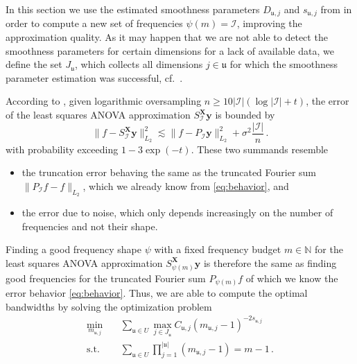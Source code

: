 \documentclass[a4paper]{scrartcl}
\numberwithin{equation}{section}
\begin{document}
In this section we use the estimated smoothness parameters $D_{\mathfrak u,j}$ and $s_{\mathfrak u,j}$ from  in order to compute a new set of frequencies $\psi(m) = \mathcal I$, improving the approximation quality.
As it may happen that we are not able to detect the smoothness parameters for certain dimensions for a lack of available data, we define the set $J_{\mathfrak u}$, which collects all dimensions $j\in\mathfrak u$ for which the smoothness parameter estimation was successful, cf.~.

According to \cite[Theorem~1.1]{Bartel22}, given logarithmic oversampling $n\ge 10|\mathcal I|(\log|\mathcal I| + t)$, the error of the least squares ANOVA approximation $S_{\mathcal I}^{\bm X}\bm y$ is bounded by
\begin{equation}\label{eq:sap}
    \|f-S_{\mathcal I}^{\bm X}\bm y\|_{L_2}^{2}
    \lesssim \|f-P_{\mathcal I}\bm y\|_{L_2}^{2} + \sigma^2\frac{|\mathcal I|}{n} \,.
\end{equation}
with probability exceeding $1-3\exp(-t)$.
These two summands resemble
\begin{itemize}
    \item the truncation error behaving the same as the truncated Fourier sum $\|P_{\mathcal I} f - f\|_{L_2}$, which we already know from \eqref{eq:behavior}, and
    \item the error due to noise, which only depends increasingly on the number of frequencies and not their shape.
\end{itemize}
Finding a good frequency shape $\psi$ with a fixed frequency budget $m\in\mathds N$ for the least squares ANOVA approximation $S_{\psi(m)}^{\bm X}\bm y$ is therefore the same as finding good frequencies for the truncated Fourier sum $P_{\psi(m)}f$ of which we know the error behavior \eqref{eq:behavior}.
Thus, we are able to compute the optimal bandwidths by solving the optimization problem
\begin{equation}\label{eq:opti}
    \begin{aligned}
        \min_{m_{\mathfrak u,j}} \quad &\sum_{\mathfrak u\in U} \max_{j\in J_{\mathfrak u}} C_{\mathfrak u,j} (m_{\mathfrak u,j}-1)^{-2s_{\mathfrak u,j}} \\
        \mathrm{s.t.} \quad &\sum_{\mathfrak u\in U} \prod_{j=1}^{|\mathfrak u|} (m_{\mathfrak u,j}-1) = m-1 \,.
    \end{aligned}
\end{equation}
\end{document}
